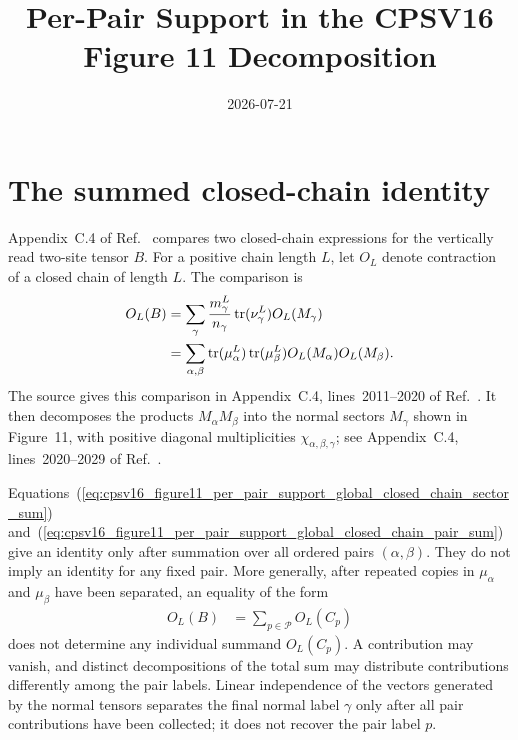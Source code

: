 \documentclass{article}
\title{Per-Pair Support in the CPSV16 Figure 11 Decomposition}
\author{}
\date{2026-07-21}
\begin{document}
\maketitle
{}

\section{The summed closed-chain identity}

Appendix~C.4 of Ref.~\cite{Cirac2016MPDO_arXiv} compares two closed-chain
expressions for the vertically read two-site tensor $B$. For a positive chain
length $L$, let $O_L$ denote contraction of a closed chain of length $L$. The
comparison is
\begin{align}
    O_L(B)
        &= \sum_\gamma \frac{m_\gamma^L}{n_\gamma}
            \operatorname{tr}(\nu_\gamma^L)O_L(M_\gamma)
    \label{eq:cpsv16_figure11_per_pair_support_global_closed_chain_sector_sum}\\
        &= \sum_{\alpha,\beta}
            \operatorname{tr}(\mu_\alpha^L)\operatorname{tr}(\mu_\beta^L)
            O_L(M_\alpha)O_L(M_\beta).
    \label{eq:cpsv16_figure11_per_pair_support_global_closed_chain_pair_sum}
\end{align}
The source gives this comparison in Appendix~C.4, lines~2011--2020 of
Ref.~\cite{Cirac2016MPDO_arXiv}. It then decomposes the products
$M_\alpha M_\beta$ into the normal sectors $M_\gamma$ shown in Figure~11,
with positive diagonal multiplicities $\chi_{\alpha,\beta,\gamma}$; see
Appendix~C.4, lines~2020--2029 of Ref.~\cite{Cirac2016MPDO_arXiv}.

Equations~(\ref{eq:cpsv16_figure11_per_pair_support_global_closed_chain_sector_sum})
and~(\ref{eq:cpsv16_figure11_per_pair_support_global_closed_chain_pair_sum})
give an identity only after summation over all ordered pairs
$(\alpha,\beta)$. They do not imply an identity for any fixed pair. More
generally, after repeated copies in $\mu_\alpha$ and $\mu_\beta$ have been
separated, an equality of the form
\begin{align}
    O_L(B)
        &= \sum_{p\in\mathcal P}O_L(C_p)
    \label{eq:cpsv16_figure11_per_pair_support_summed_copy_pairs}
\end{align}
does not determine any individual summand $O_L(C_p)$. A contribution may
vanish, and distinct decompositions of the total sum may distribute
contributions differently among the pair labels. Linear independence of the
vectors generated by the normal tensors separates the final normal label
$\gamma$ only after all pair contributions have been collected; it does not
recover the pair label $p$.
\end{document}
